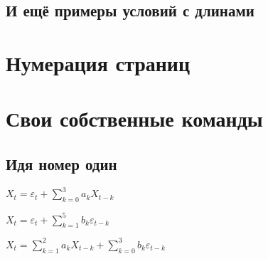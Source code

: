 \documentclass[12pt, a4paper]{article}
\theoremstyle{plain}              %
\theoremstyle{definition}         %
\renewcommand{\thepage}{\ifthispageodd{\Asbuk{page}}{\Roman{page}}}
\begin{document}
\subsection{И ещё примеры условий с длинами} 





\newlength{\lengthA}
\setlength{\lengthA}{7.25pt}
\newlength{\lengthB}
\setlength{\lengthB}{4.75pt}




\newpage

\section{Нумерация страниц} 



\section{Свои собственные команды} 

\subsection{Идя номер один} 

\newcommand{\AR}[1]{\ensuremath {X_t=\varepsilon_t + \sum_{k=0}^{#1}a_k X_{t-k}}}  %

\AR{3} \\

\newcommand{\MA}[1]{\ensuremath {X_t=\varepsilon_t + \sum_{k=1}^{#1}b_k \varepsilon_{t-k}}} %

\MA{5}  \\

\newcommand{\ARMA}[2]{\ensuremath {X_t=\sum_{k=1}^{#1}a_k X_{t-k} + \sum_{k=0}^{#2}b_k \varepsilon_{t-k}}} 

\ARMA{2}{3} \\

\end{document}
